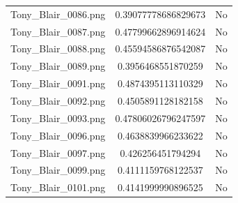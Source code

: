 \documentclass[12pt]{article}
\begin{document}
\begin{center}
\begin{tabular}{ccc}
Tony\_Blair\_0086.png & 0.39077778686829673 & No\\
Tony\_Blair\_0087.png & 0.47799662896914624 & No\\
Tony\_Blair\_0088.png & 0.45594586876542087 & No\\
Tony\_Blair\_0089.png & 0.3956468551870259 & No\\
Tony\_Blair\_0091.png & 0.4874395113110329 & No\\
Tony\_Blair\_0092.png & 0.4505891128182158 & No\\
Tony\_Blair\_0093.png & 0.47806026796247597 & No\\
Tony\_Blair\_0096.png & 0.4638839966233622 & No\\
Tony\_Blair\_0097.png & 0.426256451794294 & No\\
Tony\_Blair\_0099.png & 0.4111159768122537 & No\\
Tony\_Blair\_0101.png & 0.4141999990896525 & No\\
\end{tabular}


\end{center}
\end{document}

